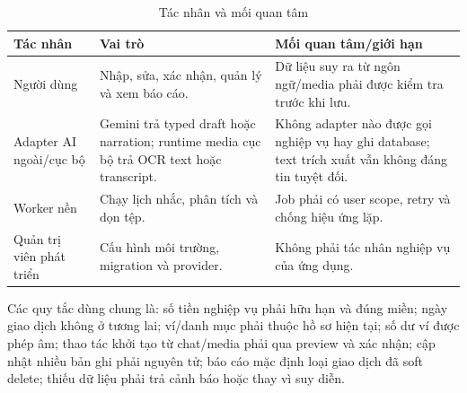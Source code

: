 \begin{table}[H]
  \centering
  \caption{Tác nhân và mối quan tâm}
  \label{tab:actors}
  \begin{tabularx}{\textwidth}{@{}L{3.2cm}Y Y@{}}
    \toprule
    \textbf{Tác nhân} & \textbf{Vai trò} & \textbf{Mối quan tâm/giới hạn} \\
    \midrule
    Người dùng & Nhập, sửa, xác nhận, quản lý và xem báo cáo. & Dữ liệu suy ra từ ngôn ngữ/media phải được kiểm tra trước khi lưu. \\
    Adapter AI ngoài/cục bộ & Gemini trả typed draft hoặc narration; runtime media cục bộ trả OCR text hoặc transcript. & Không adapter nào được gọi nghiệp vụ hay ghi database; text trích xuất vẫn không đáng tin tuyệt đối. \\
    Worker nền & Chạy lịch nhắc, phân tích và dọn tệp. & Job phải có user scope, retry và chống hiệu ứng lặp. \\
    Quản trị viên phát triển & Cấu hình môi trường, migration và provider. & Không phải tác nhân nghiệp vụ của ứng dụng. \\
    \bottomrule
  \end{tabularx}
\end{table}

Các quy tắc dùng chung là: số tiền nghiệp vụ phải hữu hạn và đúng miền; ngày giao dịch không ở tương lai; ví/danh mục phải thuộc hồ sơ hiện tại; số dư ví được phép âm; thao tác khởi tạo từ chat/media phải qua preview và xác nhận; cập nhật nhiều bản ghi phải nguyên tử; báo cáo mặc định loại giao dịch đã soft delete; thiếu dữ liệu phải trả cảnh báo hoặc  thay vì suy diễn.


